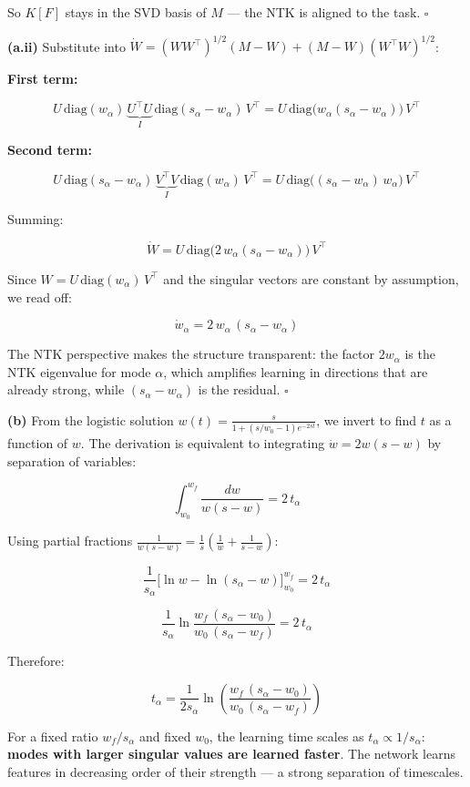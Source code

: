 \documentclass[
]{article}
\begin{document}
So \(K[F]\) stays in the SVD basis of \(M\) --- the NTK is aligned to
the task. \(\square\)

\textbf{(a.ii)} Substitute into
\(\dot{W} = (WW^\top)^{1/2}(M-W) + (M-W)(W^\top W)^{1/2}\):

\textbf{First term:}

\[U\,\text{diag}(w_\alpha)\,\underbrace{U^\top U}_{I}\,\text{diag}(s_\alpha - w_\alpha)\,V^\top = U\,\text{diag}\big(w_\alpha(s_\alpha - w_\alpha)\big)\,V^\top\]

\textbf{Second term:}

\[U\,\text{diag}(s_\alpha - w_\alpha)\,\underbrace{V^\top V}_{I}\,\text{diag}(w_\alpha)\,V^\top = U\,\text{diag}\big((s_\alpha - w_\alpha)\,w_\alpha\big)\,V^\top\]

Summing:

\[\dot{W} = U\,\text{diag}\big(2\,w_\alpha(s_\alpha - w_\alpha)\big)\,V^\top\]

Since \(W = U\,\text{diag}(w_\alpha)\,V^\top\) and the singular vectors
are constant by assumption, we read off:

\[\boxed{\dot{w}_\alpha = 2\,w_\alpha\,(s_\alpha - w_\alpha)}\]

The NTK perspective makes the structure transparent: the factor
\(2w_\alpha\) is the NTK eigenvalue for mode \(\alpha\), which amplifies
learning in directions that are already strong, while
\((s_\alpha - w_\alpha)\) is the residual. \(\square\)

\textbf{(b)} From the logistic solution
\(w(t) = \frac{s}{1 + (s/w_0 - 1)e^{-2st}}\), we invert to find \(t\) as
a function of \(w\). The derivation is equivalent to integrating
\(\dot{w} = 2w(s-w)\) by separation of variables:

\[\int_{w_0}^{w_f} \frac{dw}{w(s-w)} = 2\,t_\alpha\]

Using partial fractions
\(\frac{1}{w(s-w)} = \frac{1}{s}\!\left(\frac{1}{w} + \frac{1}{s-w}\right)\):

\[\frac{1}{s_\alpha}\Big[\ln w - \ln(s_\alpha - w)\Big]_{w_0}^{w_f} = 2\,t_\alpha\]

\[\frac{1}{s_\alpha}\ln\frac{w_f\,(s_\alpha - w_0)}{w_0\,(s_\alpha - w_f)} = 2\,t_\alpha\]

Therefore:

\[\boxed{t_\alpha = \frac{1}{2s_\alpha}\ln\left(\frac{w_f\,(s_\alpha - w_0)}{w_0\,(s_\alpha - w_f)}\right)}\]

For a fixed ratio \(w_f/s_\alpha\) and fixed \(w_0\), the learning time
scales as \(t_\alpha \propto 1/s_\alpha\): \textbf{modes with larger
singular values are learned faster}. The network learns features in
decreasing order of their strength --- a strong separation of
timescales.
\end{document}
